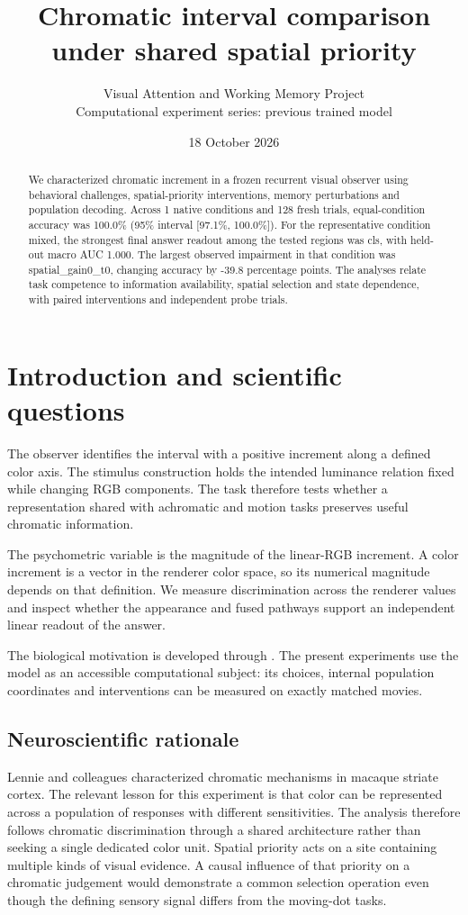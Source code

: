 \documentclass[11pt]{article}
\begin{document}
\title{\color{ink}Chromatic interval comparison under shared spatial priority}
\author{Visual Attention and Working Memory Project\\Computational experiment series: previous trained model}\date{18 October 2026}\maketitle
\begin{abstract}
We characterized chromatic increment in a frozen recurrent visual observer using behavioral challenges, spatial-priority interventions, memory perturbations and population decoding. Across 1 native conditions and 128 fresh trials, equal-condition accuracy was 100.0\% (95\% interval [97.1\%, 100.0\%]). For the representative condition mixed, the strongest final answer readout among the tested regions was cls, with held-out macro AUC 1.000. The largest observed impairment in that condition was spatial\_\allowbreak{}gain0\_\allowbreak{}t0, changing accuracy by -39.8 percentage points. The analyses relate task competence to information availability, spatial selection and state dependence, with paired interventions and independent probe trials.
\end{abstract}
\section{Introduction and scientific questions}
The observer identifies the interval with a positive increment along a defined color axis. The stimulus construction holds the intended luminance relation fixed while changing RGB components. The task therefore tests whether a representation shared with achromatic and motion tasks preserves useful chromatic information.

The psychometric variable is the magnitude of the linear-RGB increment. A color increment is a vector in the renderer color space, so its numerical magnitude depends on that definition. We measure discrimination across the renderer values and inspect whether the appearance and fused pathways support an independent linear readout of the answer.

The biological motivation is developed through \cite{color}. The present experiments use the model as an accessible computational subject: its choices, internal population coordinates and interventions can be measured on exactly matched movies.

\subsection{Neuroscientific rationale}
Lennie and colleagues characterized chromatic mechanisms in macaque striate cortex. The relevant lesson for this experiment is that color can be represented across a population of responses with different sensitivities. The analysis therefore follows chromatic discrimination through a shared architecture rather than seeking a single dedicated color unit. Spatial priority acts on a site containing multiple kinds of visual evidence. A causal influence of that priority on a chromatic judgement would demonstrate a common selection operation even though the defining sensory signal differs from the moving-dot tasks.
\end{document}
